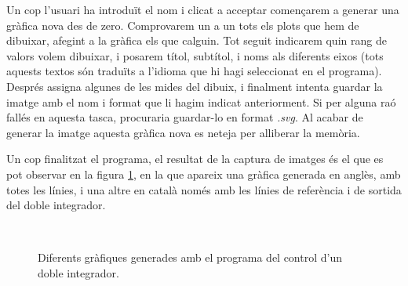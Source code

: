 
Un cop l'usuari ha introduït el nom i clicat a acceptar començarem a generar una gràfica nova des de zero. Comprovarem un a un tots els plots que hem de dibuixar, afegint a la gràfica els que calguin.
Tot seguit indicarem quin rang de valors volem dibuixar, i posarem títol, subtítol, i noms als diferents eixos (tots aquests textos són traduïts a l'idioma que hi hagi seleccionat en el programa).
Després assigna algunes de les mides del dibuix, i finalment intenta guardar la imatge amb el nom i format que li hagim indicat anteriorment. Si per alguna raó fallés en aquesta tasca, procuraria guardar-lo en format \emph{.svg}.
Al acabar de generar la imatge aquesta gràfica nova es neteja per alliberar la memòria.

Un cop finalitzat el programa, el resultat de la captura de imatges és el que es pot observar en la figura \ref{fig:comparacio:graph}, en la que apareix una gràfica generada en anglès, amb totes les línies, i una altre en català només amb les línies de referència i de sortida del doble integrador.

\begin{figure}[ht!]
	\\

	\caption[Diferents gràfiques generades amb el programa \DCSMonitor]{Diferents gràfiques generades amb el programa \DCSMonitor del control d'un doble integrador.}
    \label{fig:comparacio:graph}
\end{figure}

